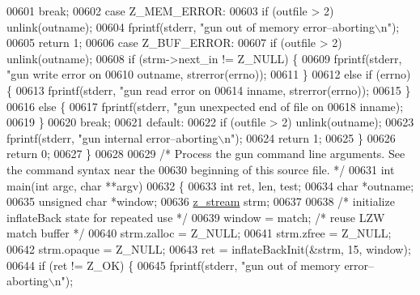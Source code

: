 \begin{DoxyCode}
{{{{00601         \textcolor{keywordflow}{break};
00602     \textcolor{keywordflow}{case} Z\_MEM\_ERROR:
00603         \textcolor{keywordflow}{if} (outfile > 2) unlink(outname);
00604         fprintf(stderr, \textcolor{stringliteral}{"gun out of memory error--aborting\(\backslash\)n"});
00605         \textcolor{keywordflow}{return} 1;
00606     \textcolor{keywordflow}{case} Z\_BUF\_ERROR:
00607         \textcolor{keywordflow}{if} (outfile > 2) unlink(outname);
00608         \textcolor{keywordflow}{if} (strm->next\_in != Z\_NULL) \{
00609             fprintf(stderr, \textcolor{stringliteral}{"gun write error on %
00610                     outname, strerror(errno));
00611         \}
00612         \textcolor{keywordflow}{else} \textcolor{keywordflow}{if} (errno) \{
00613             fprintf(stderr, \textcolor{stringliteral}{"gun read error on %
00614                     inname, strerror(errno));
00615         \}
00616         \textcolor{keywordflow}{else} \{
00617             fprintf(stderr, \textcolor{stringliteral}{"gun unexpected end of file on %
00618                     inname);
00619         \}
00620         \textcolor{keywordflow}{break};
00621     \textcolor{keywordflow}{default}:
00622         \textcolor{keywordflow}{if} (outfile > 2) unlink(outname);
00623         fprintf(stderr, \textcolor{stringliteral}{"gun internal error--aborting\(\backslash\)n"});
00624         \textcolor{keywordflow}{return} 1;
00625     \}
00626     \textcolor{keywordflow}{return} 0;
00627 \}
00628 
00629 \textcolor{comment}{/* Process the gun command line arguments.  See the command syntax near the}
00630 \textcolor{comment}{   beginning of this source file. */}
00631 \textcolor{keywordtype}{int} main(\textcolor{keywordtype}{int} argc, \textcolor{keywordtype}{char} **argv)
00632 \{
00633     \textcolor{keywordtype}{int} ret, len, test;
00634     \textcolor{keywordtype}{char} *outname;
00635     \textcolor{keywordtype}{unsigned} \textcolor{keywordtype}{char} *window;
00636     \hyperlink{structz__stream__s}{z\_stream} strm;
00637 
00638     \textcolor{comment}{/* initialize inflateBack state for repeated use */}
00639     window = match;                         \textcolor{comment}{/* reuse LZW match buffer */}
00640     strm.zalloc = Z\_NULL;
00641     strm.zfree = Z\_NULL;
00642     strm.opaque = Z\_NULL;
00643     ret = inflateBackInit(&strm, 15, window);
00644     \textcolor{keywordflow}{if} (ret != Z\_OK) \{
00645         fprintf(stderr, \textcolor{stringliteral}{"gun out of memory error--aborting\(\backslash\)n"});
}}}}}}}
\end{DoxyCode}
